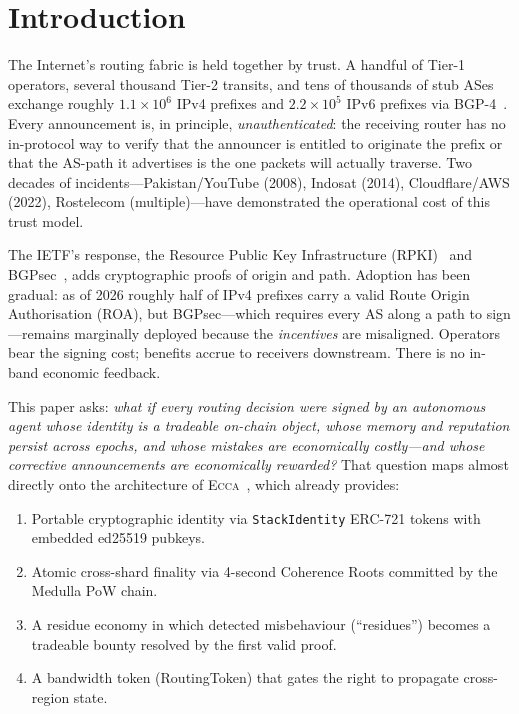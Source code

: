 \documentclass[11pt,twocolumn]{article}
\theoremstyle{definition}
\theoremstyle{plain}
\theoremstyle{remark}
\newcommand{\ecca}{\textsc{Ecca}}
\newcommand{\code}[1]{\texttt{#1}}
\begin{document}
\section{Introduction}\label{sec:intro}

The Internet's routing fabric is held together by trust. A handful of Tier-1 operators, several thousand Tier-2 transits, and tens of thousands of stub ASes exchange roughly $1.1 \times 10^{6}$ IPv4 prefixes and $2.2 \times 10^{5}$ IPv6 prefixes via BGP-4~\cite{rfc4271}. Every announcement is, in principle, \emph{unauthenticated}: the receiving router has no in-protocol way to verify that the announcer is entitled to originate the prefix or that the AS-path it advertises is the one packets will actually traverse. Two decades of incidents---Pakistan/YouTube (2008), Indosat (2014), Cloudflare/AWS (2022), Rostelecom (multiple)---have demonstrated the operational cost of this trust model.

The IETF's response, the Resource Public Key Infrastructure (RPKI)~\cite{rfc6480} and BGPsec~\cite{rfc8205}, adds cryptographic proofs of origin and path. Adoption has been gradual: as of 2026 roughly half of IPv4 prefixes carry a valid Route Origin Authorisation (ROA), but BGPsec---which requires every AS along a path to sign---remains marginally deployed because the \emph{incentives} are misaligned. Operators bear the signing cost; benefits accrue to receivers downstream. There is no in-band economic feedback.

This paper asks: \emph{what if every routing decision were signed by an autonomous agent whose identity is a tradeable on-chain object, whose memory and reputation persist across epochs, and whose mistakes are economically costly---and whose corrective announcements are economically rewarded?} That question maps almost directly onto the architecture of \ecca{}~\cite{ecca2026}, which already provides:

\begin{enumerate}[leftmargin=*,itemsep=2pt]
  \item Portable cryptographic identity via \code{StackIdentity} ERC-721 tokens with embedded ed25519 pubkeys.
  \item Atomic cross-shard finality via 4-second Coherence Roots committed by the Medulla PoW chain.
  \item A residue economy in which detected misbehaviour (``residues'') becomes a tradeable bounty resolved by the first valid proof.
  \item A bandwidth token (RoutingToken) that gates the right to propagate cross-region state.
\end{enumerate}
\end{document}
